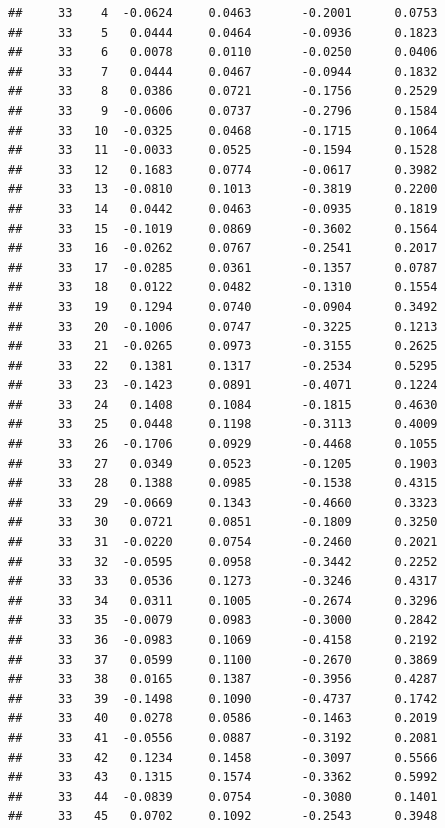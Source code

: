\documentclass[
]{article}
\begin{document}
\begin{verbatim}
##     33    4  -0.0624     0.0463       -0.2001      0.0753  
##     33    5   0.0444     0.0464       -0.0936      0.1823  
##     33    6   0.0078     0.0110       -0.0250      0.0406  
##     33    7   0.0444     0.0467       -0.0944      0.1832  
##     33    8   0.0386     0.0721       -0.1756      0.2529  
##     33    9  -0.0606     0.0737       -0.2796      0.1584  
##     33   10  -0.0325     0.0468       -0.1715      0.1064  
##     33   11  -0.0033     0.0525       -0.1594      0.1528  
##     33   12   0.1683     0.0774       -0.0617      0.3982  
##     33   13  -0.0810     0.1013       -0.3819      0.2200  
##     33   14   0.0442     0.0463       -0.0935      0.1819  
##     33   15  -0.1019     0.0869       -0.3602      0.1564  
##     33   16  -0.0262     0.0767       -0.2541      0.2017  
##     33   17  -0.0285     0.0361       -0.1357      0.0787  
##     33   18   0.0122     0.0482       -0.1310      0.1554  
##     33   19   0.1294     0.0740       -0.0904      0.3492  
##     33   20  -0.1006     0.0747       -0.3225      0.1213  
##     33   21  -0.0265     0.0973       -0.3155      0.2625  
##     33   22   0.1381     0.1317       -0.2534      0.5295  
##     33   23  -0.1423     0.0891       -0.4071      0.1224  
##     33   24   0.1408     0.1084       -0.1815      0.4630  
##     33   25   0.0448     0.1198       -0.3113      0.4009  
##     33   26  -0.1706     0.0929       -0.4468      0.1055  
##     33   27   0.0349     0.0523       -0.1205      0.1903  
##     33   28   0.1388     0.0985       -0.1538      0.4315  
##     33   29  -0.0669     0.1343       -0.4660      0.3323  
##     33   30   0.0721     0.0851       -0.1809      0.3250  
##     33   31  -0.0220     0.0754       -0.2460      0.2021  
##     33   32  -0.0595     0.0958       -0.3442      0.2252  
##     33   33   0.0536     0.1273       -0.3246      0.4317  
##     33   34   0.0311     0.1005       -0.2674      0.3296  
##     33   35  -0.0079     0.0983       -0.3000      0.2842  
##     33   36  -0.0983     0.1069       -0.4158      0.2192  
##     33   37   0.0599     0.1100       -0.2670      0.3869  
##     33   38   0.0165     0.1387       -0.3956      0.4287  
##     33   39  -0.1498     0.1090       -0.4737      0.1742  
##     33   40   0.0278     0.0586       -0.1463      0.2019  
##     33   41  -0.0556     0.0887       -0.3192      0.2081  
##     33   42   0.1234     0.1458       -0.3097      0.5566  
##     33   43   0.1315     0.1574       -0.3362      0.5992  
##     33   44  -0.0839     0.0754       -0.3080      0.1401  
##     33   45   0.0702     0.1092       -0.2543      0.3948  

\end{verbatim}
\end{document}
